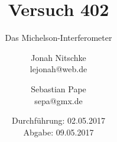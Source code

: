 

\title{Versuch 402}
\subtitle{Das Michelson-Interferometer}
\author{Jonah Nitschke\\
        lejonah@web.de \and
        Sebastian Pape\\
        sepa@gmx.de}
\date{Durchführung: 02.05.2017\\
      Abgabe: 09.05.2017}



\maketitle
\newpage
\setcounter{page}{1}




\printbibliography


